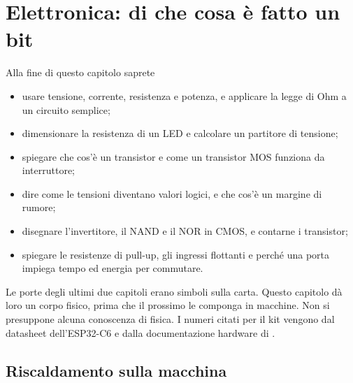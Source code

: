 \chapter{Elettronica: di che cosa è fatto un bit}
\label{ch:electronics}


\begin{chapgoals}
Alla fine di questo capitolo saprete
\begin{itemize}
\item usare tensione, corrente, resistenza e potenza, e applicare la legge di Ohm a un circuito semplice;
\item dimensionare la resistenza di un LED e calcolare un partitore di tensione;
\item spiegare che cos'è un transistor e come un transistor MOS funziona da interruttore;
\item dire come le tensioni diventano valori logici, e che cos'è un margine di rumore;
\item disegnare l'invertitore, il NAND e il NOR in CMOS, e contarne i transistor;
\item spiegare le resistenze di pull-up, gli ingressi flottanti e perché una porta impiega tempo ed energia per commutare.
\end{itemize}
\end{chapgoals}


Le porte degli ultimi due capitoli erano simboli sulla carta. Questo capitolo
dà loro un corpo fisico, prima che il prossimo le componga in macchine. Non si
presuppone alcuna conoscenza di fisica. I numeri citati per il kit vengono dal
datasheet dell'ESP32-C6 \citep{esp32c6trm} e dalla documentazione hardware di
\prg.

\section{Riscaldamento sulla macchina}


